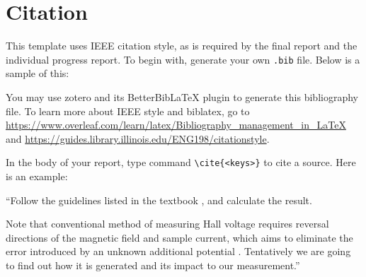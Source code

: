 \chapter{Citation}
This template uses IEEE citation style, as is required by the final report and the individual progress report. To begin with, generate your own \verb|.bib| file. Below is a sample of this:



You may use zotero and its BetterBibLaTeX plugin to generate this bibliography file. To learn more about IEEE style and biblatex, go to \url{https://www.overleaf.com/learn/latex/Bibliography_management_in_LaTeX} and \url{https://guides.library.illinois.edu/ENG198/citationstyle}.

In the body of your report, type command \verb|\cite{<keys>}| to cite a source. Here is an example:

  ``Follow the guidelines listed in the textbook \cite[pp. 129-130]{streetman2015}, and calculate the result.

  Note that conventional method of measuring Hall voltage requires reversal directions of the magnetic field and sample current, which aims to eliminate the error introduced by an unknown additional potential \cite{li2023}. Tentatively we are going to find out how it is generated and its impact to our measurement.''
